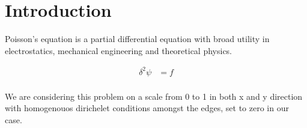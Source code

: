 \section{Introduction}
Poisson's equation is a partial differential equation with broad utility in
electrostatics, mechanical engineering and theoretical physics.\cite{wiki}

\begin{align}
	\delta^2 \psi &= f \\
\end{align}

We are considering this problem on a scale from 0 to 1 in both x and y
direction with homogenouos dirichelet conditions amongst the edges, set to zero
in our case. 
